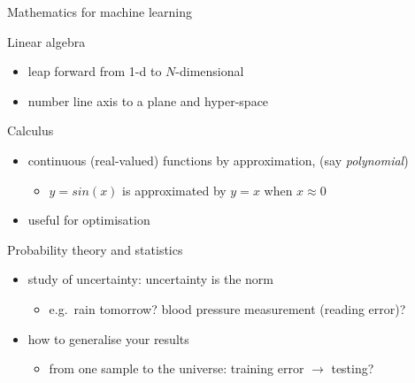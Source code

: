 \documentclass{scrartcl}
\def\tightlist{}
\begin{document}
\begin{frame}{Mathematics for machine learning}
\protect\hypertarget{mathematics-for-machine-learning}{}

Linear algebra

\begin{itemize}
\tightlist
\item
  leap forward from 1-d to \(N\)-dimensional
\item
  number line axis to a plane and hyper-space 
\end{itemize}

\bigskip Calculus

\begin{itemize}
\tightlist
\item
  continuous (real-valued) functions by approximation, (say
  \emph{polynomial})

  \begin{itemize}
  \tightlist
  \item
    \(y= sin(x)\) is approximated by \(y=x\) when \(x \approx 0\)
  \end{itemize}
\item
  useful for optimisation
\end{itemize}

\bigskip Probability theory and statistics

\begin{itemize}
\tightlist
\item
  study of uncertainty: uncertainty is the norm

  \begin{itemize}
  \tightlist
  \item
    e.g.~rain tomorrow? blood pressure measurement (reading error)?
  \end{itemize}
\item
  how to generalise your results

  \begin{itemize}
  \tightlist
  \item
    from one sample to the universe: training error \(\rightarrow\)
    testing?
  \end{itemize}
\end{itemize}

\end{frame}
\end{document}
